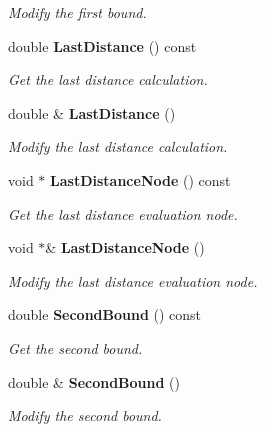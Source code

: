 \begin{DoxyCompactItemize}
\begin{DoxyCompactList}\small\item\em Modify the first bound. \end{DoxyCompactList}\item 
double {\bf Last\-Distance} () const 
\begin{DoxyCompactList}\small\item\em Get the last distance calculation. \end{DoxyCompactList}\item 
double \& {\bf Last\-Distance} ()
\begin{DoxyCompactList}\small\item\em Modify the last distance calculation. \end{DoxyCompactList}\item 
void $\ast$ {\bf Last\-Distance\-Node} () const 
\begin{DoxyCompactList}\small\item\em Get the last distance evaluation node. \end{DoxyCompactList}\item 
void $\ast$\& {\bf Last\-Distance\-Node} ()
\begin{DoxyCompactList}\small\item\em Modify the last distance evaluation node. \end{DoxyCompactList}\item 
double {\bf Second\-Bound} () const 
\begin{DoxyCompactList}\small\item\em Get the second bound. \end{DoxyCompactList}\item 
double \& {\bf Second\-Bound} ()
\begin{DoxyCompactList}\small\item\em Modify the second bound. \end{DoxyCompactList}\end{DoxyCompactItemize}
